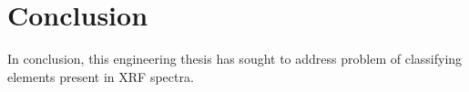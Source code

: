 \section{Conclusion}
In conclusion, this engineering thesis has sought to address problem of classifying elements present in XRF spectra. 




